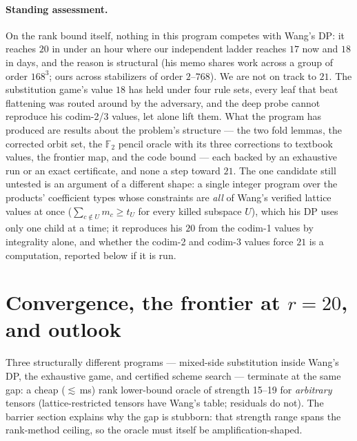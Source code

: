 \documentclass[11pt]{article}
\theoremstyle{definition}
\newcommand{\F}{\mathbb{F}_2}
\begin{document}
\paragraph{Standing assessment.} On the rank bound itself, nothing in
this program competes with Wang's DP: it reaches $20$ in under an hour
where our independent ladder reaches $17$ now and $18$ in days, and the
reason is structural (his memo shares work across a group of order
$168^3$; ours across stabilizers of order $2$--$768$). We are not on track
to $21$. The substitution game's value $18$ has held under four rule sets,
every leaf that beat flattening was routed around by the adversary, and the
deep probe cannot reproduce his codim-2/3 values, let alone lift them. What
the program has produced are results about the problem's structure --- the
two fold lemmas, the corrected orbit set, the $\F$ pencil oracle with its
three corrections to textbook values, the frontier map, and the code bound
--- each backed by an exhaustive run or an exact certificate, and none a
step toward $21$. The one candidate still untested is an argument of a
different shape: a single integer program over the products' coefficient
types whose constraints are \emph{all} of Wang's verified lattice values at
once ($\sum_{c\notin U} m_c \ge t_U$ for every killed subspace $U$), which
his DP uses only one child at a time; it reproduces his $20$ from the
codim-1 values by integrality alone, and whether the codim-2 and codim-3
values force $21$ is a computation, reported below if it is run.

\section{Convergence, the frontier at $r=20$, and outlook}
\label{sec:outlook}

Three structurally different programs --- mixed-side substitution inside
Wang's DP, the exhaustive game, and certified scheme search --- terminate
at the same gap: a cheap ($\lesssim$\,ms) rank lower-bound oracle of
strength 15--19 for \emph{arbitrary} tensors (lattice-restricted tensors
have Wang's table; residuals do not). The barrier section explains why
the gap is stubborn: that strength range spans the rank-method ceiling,
so the oracle must itself be amplification-shaped.
\end{document}
